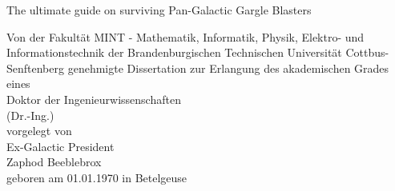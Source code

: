 %
%
\thispagestyle{empty}

\begin{center}
    \vspace{-3.5cm}
    \Huge{{The ultimate guide on surviving Pan-Galactic Gargle Blasters}}\\
    \vspace{4em}

    \large{Von der Fakultät MINT - Mathematik, Informatik, Physik, Elektro- und Informationstechnik der Brandenburgischen Technischen Universität Cottbus-Senftenberg genehmigte Dissertation
    zur Erlangung des akademischen Grades eines}\\
    \vspace{0.7cm}
    Doktor der Ingenieurwissenschaften\\
(Dr.-Ing.)\\
    \vspace{0.7cm}
    vorgelegt von\\
    \vspace{0.7cm}
    Ex-Galactic President\\
    \vspace{0.35cm}
    Zaphod Beeblebrox\\
    \vspace{0.7cm}
    geboren am 01.01.1970 in Betelgeuse\\
\end{center}

\vfill
\begin{center}
    \large
    \\[0.2em]
    \\[0.2em]
    \\[0.2em]
    \\[1em]

    \\[0.2em]
    \normalsize
\end{center}
